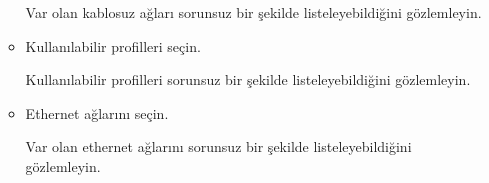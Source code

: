 \documentclass[a4paper,10pt]{article}
\begin{document}
\begin{enumerate}
\begin{itemize}
	 Var olan kablosuz ağları sorunsuz bir şekilde listeleyebildiğini gözlemleyin.
	
 	\item Kullanılabilir profilleri seçin.
	
	Kullanılabilir profilleri sorunsuz bir şekilde listeleyebildiğini gözlemleyin.
	
	\item Ethernet ağlarını seçin.
	
	 Var olan ethernet ağlarını sorunsuz bir şekilde listeleyebildiğini gözlemleyin.
	
	\end{itemize}

\end{enumerate}
\end{document}
